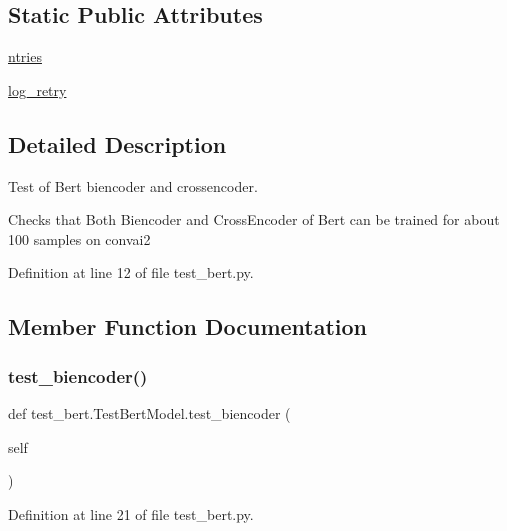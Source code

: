 \subsection*{Static Public Attributes}
\begin{DoxyCompactItemize}
\item 
\hyperlink{classtest__bert_1_1TestBertModel_af62ecae2b9496780476aae9732a03d26}{ntries}
\item 
\hyperlink{classtest__bert_1_1TestBertModel_af6b428797cdbe20ca87f4b1379235347}{log\+\_\+retry}
\end{DoxyCompactItemize}


\subsection{Detailed Description}
\begin{DoxyVerb}Test of Bert biencoder and crossencoder.

Checks that Both Biencoder and CrossEncoder of Bert can be trained for about 100
samples on convai2
\end{DoxyVerb}
 

Definition at line 12 of file test\+\_\+bert.\+py.



\subsection{Member Function Documentation}
\mbox{\label{classtest__bert_1_1TestBertModel_a58a6c62d3ef3009a203c407feea4852b}} 
\subsubsection{\texorpdfstring{test\+\_\+biencoder()}{test\_biencoder()}}
{\footnotesize\ttfamily def test\+\_\+bert.\+Test\+Bert\+Model.\+test\+\_\+biencoder (\begin{DoxyParamCaption}\item[{}]{self }\end{DoxyParamCaption})}



Definition at line 21 of file test\+\_\+bert.\+py.



